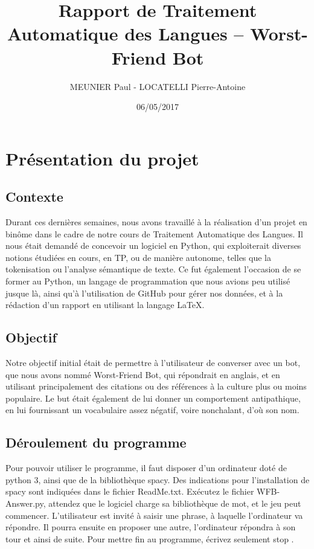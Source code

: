 \documentclass[paper=a4, fontsize=11pt]{article}
\begin{document}
\title{Rapport de Traitement Automatique des Langues -- Worst-Friend Bot}
\author{MEUNIER Paul - LOCATELLI Pierre-Antoine}
\date{06/05/2017}
\maketitle

\section{Présentation du projet}

\subsection{Contexte}
Durant ces dernières semaines, nous avons travaillé à la réalisation d'un projet en binôme dans le cadre de notre cours de Traitement Automatique des Langues. Il nous était demandé de concevoir un logiciel en Python, qui exploiterait diverses notions étudiées en cours, en TP, ou de manière autonome, telles que la tokenisation ou l'analyse sémantique de texte. Ce fut également l'occasion de se former au Python, un langage de programmation que nous avions peu utilisé jusque là, ainsi qu'à l'utilisation de GitHub pour gérer nos données, et à la rédaction d'un rapport en utilisant la langage LaTeX.


\subsection{Objectif}
Notre objectif initial était de permettre à l'utilisateur de converser avec un bot, que nous avons nommé Worst-Friend Bot, qui répondrait en anglais, et en utilisant principalement des citations ou des références à la culture plus ou moins populaire. Le but était également de lui donner un comportement antipathique, en lui fournissant un vocabulaire assez négatif, voire nonchalant, d'où son nom.

\subsection{Déroulement du programme}
Pour pouvoir utiliser le programme, il faut disposer d'un ordinateur doté de python 3, ainsi que de la bibliothèque spacy. Des indications pour l'installation de spacy sont indiquées dans le fichier ReadMe.txt. Exécutez le fichier WFB-Answer.py, attendez que le logiciel charge sa bibliothèque de mot, et le jeu peut commencer. L'utilisateur est invité à saisir une phrase, à laquelle l'ordinateur va répondre. Il pourra ensuite en proposer une autre, l'ordinateur répondra à son tour et ainsi de suite. Pour mettre fin au programme, écrivez seulement \og stop \fg{}.
\end{document}
